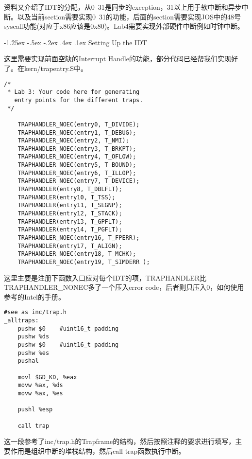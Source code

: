 \documentclass[11pt,a4paper]{article}
\makeatletter
\newcommand{\sihao}{\fontsize{14pt}{\baselineskip}\selectfont}
\renewcommand\subsection{\@startsection{subsection}{1}{\z@}%
{-1.25ex \@plus -.5ex \@minus -.2ex}%
{.4ex \@plus .1ex}%
{\normalfont\sihao\fontspec{黑体}}}
\makeatother
\begin{document}
资料又介绍了IDT的分配，从0~31是同步的exception，31以上用于软中断和异步中断。以及当前section需要实现0~31的功能，后面的section需要实现JOS中的48号syscall功能(对应于x86应该是0x80)。Lab4需要实现外部硬件中断例如时钟中断。

\subsection{Setting Up the IDT}

这里需要实现前面空缺的Interrupt Handle的功能，部分代码已经帮我们实现好了。在kern/trapentry.S中。


\setmainfont{Consolas}
\begin{lstlisting}[language={[x86masm]Assembler},firstnumber=1,title=kern/trapentry.c] 
/*
 * Lab 3: Your code here for generating 
   entry points for the different traps.
 */

	TRAPHANDLER_NOEC(entry0, T_DIVIDE);
	TRAPHANDLER_NOEC(entry1, T_DEBUG);
	TRAPHANDLER_NOEC(entry2, T_NMI);
	TRAPHANDLER_NOEC(entry3, T_BRKPT);
	TRAPHANDLER_NOEC(entry4, T_OFLOW);
	TRAPHANDLER_NOEC(entry5, T_BOUND);
	TRAPHANDLER_NOEC(entry6, T_ILLOP);
	TRAPHANDLER_NOEC(entry7, T_DEVICE);
	TRAPHANDLER(entry8, T_DBLFLT);
	TRAPHANDLER(entry10, T_TSS);
	TRAPHANDLER(entry11, T_SEGNP);
	TRAPHANDLER(entry12, T_STACK);
	TRAPHANDLER(entry13, T_GPFLT);
	TRAPHANDLER(entry14, T_PGFLT);
	TRAPHANDLER_NOEC(entry16, T_FPERR);
	TRAPHANDLER(entry17, T_ALIGN);
	TRAPHANDLER_NOEC(entry18, T_MCHK);
	TRAPHANDLER_NOEC(entry19, T_SIMDERR );
\end{lstlisting}
\setmainfont[BoldFont=黑体]{宋体}

这里主要是注册下函数入口应对每个IDT的项，TRAPHANDLER比TRAPHANDLER\_NONEC多了一个压入error code，后者则只压入0，如何使用参考的Intel的手册。


\setmainfont{Consolas}
\begin{lstlisting}[language={[x86masm]Assembler},firstnumber=1,title=kern/trapentry.c] 
 #see as inc/trap.h
_alltraps:
	pushw $0    #uint16_t padding
	pushw %ds
	pushw $0    #uint16_t padding 
	pushw %es
	pushal

    movl $GD_KD, %eax
	movw %ax, %ds
	movw %ax, %es

	pushl %esp

	call trap
\end{lstlisting}
\setmainfont[BoldFont=黑体]{宋体}

这一段参考了inc/trap.h的Trapframe的结构，然后按照注释的要求进行填写，主要作用是组织中断的堆栈结构，然后call trap函数执行中断。
\end{document}
